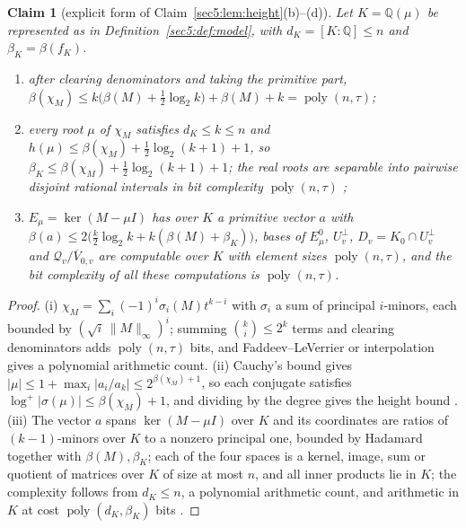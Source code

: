 \documentclass[journal]{IEEEtran}
\theoremstyle{plainn}
\newtheorem{claim}{Claim}
\theoremstyle{remark}
\newcommand{\poly}{\operatorname{poly}}
\begin{document}
\begin{claim}[explicit form of Claim~\ref{sec5:lem:height}(b)--(d)]\label{appBC:lem:charpoly}\label{appBC:lem:root}\label{appBC:cor:root}\label{appBC:lem:bases}\label{appBC:sub:roots}
Let $K=\mathbb{Q}(\mu)$ be represented as in Definition~\ref{sec5:def:model}, with
$d_K=[K:\mathbb{Q}]\le n$ and $\beta_K=\beta(f_K)$.
\begin{enumerate}[label=(\roman*),leftmargin=*]
\item after clearing denominators and taking the primitive part,
$\beta(\chi_M)\le k\bigl(\beta(M)+\tfrac12\log_2 k\bigr)+\beta(M)+k=\poly(n,\tau)$;
\item every root $\mu$ of $\chi_M$ satisfies $d_K\le k\le n$ and
$h(\mu)\le\beta(\chi_M)+\tfrac12\log_2(k+1)+1$, so $\beta_K\le\beta(\chi_M)+\tfrac12\log_2(k+1)+1$;
the real roots are separable into pairwise disjoint rational intervals in bit complexity
$\poly(n,\tau)$ \cite{bpr06};
\item $E_\mu=\ker(M-\mu I)$ has over $K$ a primitive vector $a$ with
$\beta(a)\le2\bigl(\tfrac k2\log_2 k+k(\beta(M)+\beta_K)\bigr)$, bases of $E_\mu^0$,
$U_v^\perp$, $D_v=K_0\cap U_v^\perp$ and $\mathcal{Q}_v/\overline{V}_{0,v}$ are computable over $K$
with element sizes $\poly(n,\tau)$, and the bit complexity of all these computations is
$\poly(n,\tau)$.
\end{enumerate}
\end{claim}

\begin{proof}
(i) $\chi_M=\sum_i(-1)^{i}\sigma_i(M)t^{k-i}$ with $\sigma_i$ a sum of principal $i$-minors, each
bounded by $(\sqrt i\,\|M\|_\infty)^{i}$; summing $\binom ki\le2^{k}$ terms and clearing denominators
adds $\poly(n,\tau)$ bits, and Faddeev--LeVerrier or interpolation gives a polynomial arithmetic count.
(ii) Cauchy's bound gives $|\mu|\le1+\max_i|a_i/a_k|\le2^{\beta(\chi_M)+1}$, so each conjugate
satisfies $\log^{+}|\sigma(\mu)|\le\beta(\chi_M)+1$, and dividing by the degree gives the height bound
\cite{hj13}. (iii) The vector $a$ spans $\ker(M-\mu I)$ over $K$ and its coordinates are ratios of
$(k-1)$-minors over $K$ to a nonzero principal one, bounded by Hadamard together with
$\beta(M),\beta_K$; each of the four spaces is a kernel, image, sum or quotient of matrices over $K$
of size at most $n$, and all inner products lie in $K$; the complexity follows from $d_K\le n$, a
polynomial arithmetic count, and arithmetic in $K$ at cost $\poly(d_K,\beta_K)$ bits
\cite{lan02,vzgg03}.
\end{proof}
\end{document}
